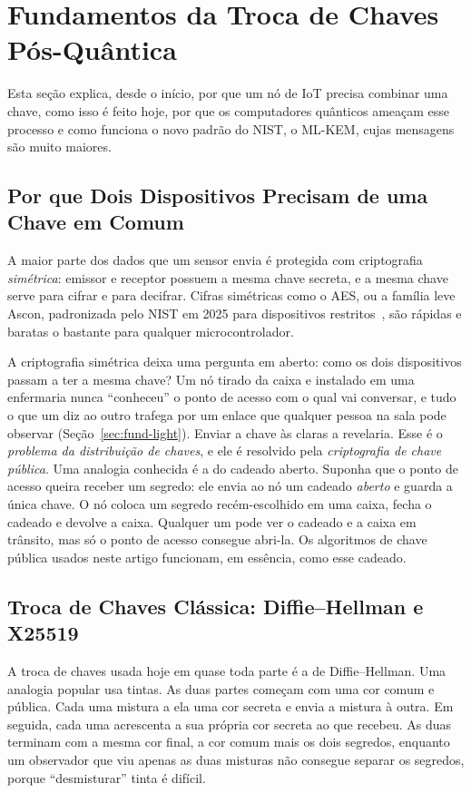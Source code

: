 \section{Fundamentos da Troca de Chaves Pós-Quântica}\label{sec:fund-pqc}
Esta seção explica, desde o início, por que um nó de IoT precisa combinar uma
chave, como isso é feito hoje, por que os computadores quânticos ameaçam esse
processo e como funciona o novo padrão do NIST, o ML-KEM, cujas mensagens são
muito maiores.

\subsection{Por que Dois Dispositivos Precisam de uma Chave em Comum}\label{sec:fund-sym}
A maior parte dos dados que um sensor envia é protegida com criptografia
\emph{simétrica}: emissor e receptor possuem a mesma chave secreta, e a mesma
chave serve para cifrar e para decifrar. Cifras simétricas como o AES, ou a
família leve Ascon, padronizada pelo NIST em 2025 para dispositivos
restritos~\cite{sp800232}, são rápidas e baratas o bastante para qualquer
microcontrolador.

A criptografia simétrica deixa uma pergunta em aberto: como os dois
dispositivos passam a ter a mesma chave? Um nó tirado da caixa e instalado em
uma enfermaria nunca ``conheceu'' o ponto de acesso com o qual vai conversar, e
tudo o que um diz ao outro trafega por um enlace que qualquer pessoa na sala
pode observar (Seção~\ref{sec:fund-light}). Enviar a chave às claras a
revelaria. Esse é o \emph{problema da distribuição de chaves}, e ele é
resolvido pela \emph{criptografia de chave pública}. Uma analogia conhecida é a
do cadeado aberto. Suponha que o ponto de acesso queira receber um segredo: ele
envia ao nó um cadeado \emph{aberto} e guarda a única chave. O nó coloca um
segredo recém-escolhido em uma caixa, fecha o cadeado e devolve a caixa.
Qualquer um pode ver o cadeado e a caixa em trânsito, mas só o ponto de acesso
consegue abri-la. Os algoritmos de chave pública usados neste artigo
funcionam, em essência, como esse cadeado.

\subsection{Troca de Chaves Clássica: Diffie--Hellman e X25519}\label{sec:fund-dh}
A troca de chaves usada hoje em quase toda parte é a de Diffie--Hellman. Uma
analogia popular usa tintas. As duas partes começam com uma cor comum e
pública. Cada uma mistura a ela uma cor secreta e envia a mistura à outra. Em
seguida, cada uma acrescenta a sua própria cor secreta ao que recebeu. As duas
terminam com a mesma cor final, a cor comum mais os dois segredos, enquanto um
observador que viu apenas as duas misturas não consegue separar os segredos,
porque ``desmisturar'' tinta é difícil.

